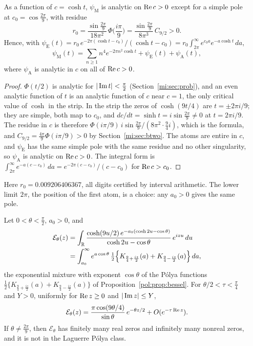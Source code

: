 \begin{proposition}\label{mi:prop:polar}
As a function of $c=\cosh t$, $\psi_{\mathrm M}$ is analytic on $\operatorname{Re} c>0$ except for a simple pole at $c_0=\cos\frac{2\pi}9$, with residue
\[
r_0=\frac{\sin\frac{2\pi}9}{18\pi^2}\,\Phi\Big(\frac{i\pi}9\Big)=\frac{\sin\frac{2\pi}9}{8\pi^3}\,C_{9/2}>0 .
\]
Hence, with $\psi_{\mathrm E}(t)=r_0\,e^{-2\pi(\cosh t-c_0)}/(\cosh t-c_0)=r_0\int_{2\pi}^\infty e^{c_0a}e^{-a\cosh t}\,da$,
\begin{equation}\label{mi:eq:psiE}
\psi_{\mathrm M}(t)=\sum_{n\ge1}n^4e^{-2\pi n^2\cosh t}+\psi_{\mathrm E}(t)+\psi_{\mathrm A}(t),
\end{equation}
where $\psi_{\mathrm A}$ is analytic in $c$ on all of $\operatorname{Re} c>0$.
\end{proposition}

\begin{proof}
$\Phi(t/2)$ is analytic for $|\operatorname{Im} t|<\frac\pi2$ (Section~\ref{mi:sec:prob}), and an even analytic function of $t$ is an analytic function of $c$ near $c=1$, the only critical value of $\cosh$ in the strip. In the strip the zeros of $\cosh(9t/4)$ are $t=\pm2\pi i/9$; they are simple, both map to $c_0$, and $dc/dt=\sinh t=i\sin\frac{2\pi}9\ne0$ at $t=2\pi i/9$. The residue in $c$ is therefore $\Phi(i\pi/9)\,i\sin\frac{2\pi}9/(8\pi^2\cdot\frac94i)$, which is the formula, and $C_{9/2}=\frac{4\pi}9\Phi(i\pi/9)>0$ by Section~\ref{mi:sec:btwo}. The atoms are entire in $c$, and $\psi_{\mathrm E}$ has the same simple pole with the same residue and no other singularity, so $\psi_{\mathrm A}$ is analytic on $\operatorname{Re} c>0$. The integral form is $\int_{2\pi}^\infty e^{-a(c-c_0)}\,da=e^{-2\pi(c-c_0)}/(c-c_0)$ for $\operatorname{Re} c>c_0$.
\end{proof}

Here $r_0=0.009206406367$, all digits certified by interval arithmetic. The lower limit $2\pi$, the position of the first atom, is a choice: any $a_0>0$ gives the same pole.

\begin{proposition}\label{mi:prop:rigid}
Let $0<\theta<\frac\pi2$, $a_0>0$, and
\begin{align*}
\mathcal E_\theta(z)&=\int_{\mathbb{R}}\frac{\cosh(9u/2)\,e^{-a_0(\cosh2u-\cos\theta)}}{\cosh2u-\cos\theta}\,e^{izu}\,du\\
&=\int_{a_0}^\infty e^{a\cos\theta}\,\tfrac12\Big\{K_{\frac94+\frac{iz}2}(a)+K_{\frac94-\frac{iz}2}(a)\Big\}\,da ,
\end{align*}
the exponential mixture with exponent $\cos\theta$ of the P\'olya functions $\frac12\{K_{\frac94+\frac{iz}2}(a)+K_{\frac94-\frac{iz}2}(a)\}$ of Proposition~\ref{pol:prop:bessel}. For $\theta/2<\tau<\frac\pi4$ and $Y>0$, uniformly for $\operatorname{Re} z\ge0$ and $|\operatorname{Im} z|\le Y$,
\[
\mathcal E_\theta(z)=\frac{\pi\cos(9\theta/4)}{\sin\theta}\,e^{-\theta z/2}+O(e^{-\tau\operatorname{Re} z}).
\]
If $\theta\ne\frac{2\pi}9$, then $\mathcal E_\theta$ has finitely many real zeros and infinitely many nonreal zeros, and it is not in the Laguerre P\'olya class.
\end{proposition}

